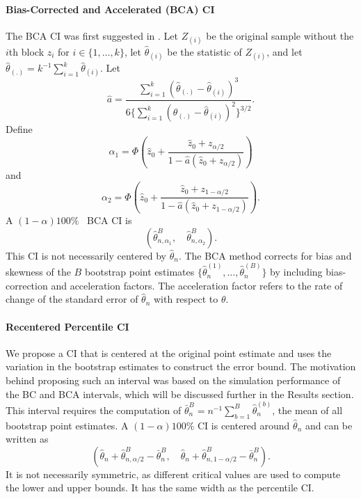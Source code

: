\documentclass[10pt]{article}
\newcommand{\eds}[1]{\textcolor{red}{EDS: (#1)}}
\newcommand{\mc}[1]{\textcolor{orange}{MC: (#1)}}
\begin{document}
\paragraph{Bias-Corrected and Accelerated (BCA) CI}
The BCA CI was first suggested in \citet{efron1987better}. Let $Z_{(i)}$ be the 
original sample without the $i$th block $z_i$ for $i \in \{1, \ldots, k\}$, let 
$\hat{\theta}_{(i)}$ be the statistic of $Z_{(i)}$, and let 
$\hat{\theta}_{(.)} = k^{-1}\sum_{i=1}^{k} \hat{\theta}_{(i)}$. 
Let
\begin{equation*}
\hat{a} = \frac{\sum_{i=1}^{k} (\hat{\theta}_{(.)} -
  \hat{\theta}_{(i)})^3}{6\{\sum_{i=1}^{k} (\hat{\theta}_{(.)} -
  \hat{\theta}_{(i)})^2\}^{3/2}}.
\end{equation*}
Define
\begin{equation*}
\alpha_1 = \Phi\left(\hat{z}_{0} + \frac{\hat{z}_{0} +
  z_{\alpha/2}}{1 - \hat{a}(\hat{z}_{0} + z_{\alpha/2})}\right)
\end{equation*}
and
\begin{equation*}
\alpha_2 = \Phi\left(\hat{z}_{0} + \frac{\hat{z}_{0} +
  z_{1 - \alpha/2}}{1 - \hat{a}(\hat{z}_{0} + z_{1 - \alpha/2})}\right).
\end{equation*}
A $(1 - \alpha)100\%$ ~BCA CI is
\[
(\hat\theta_{n, \alpha_1}^{B}, \quad \hat\theta_{n, \alpha_2}^{B}).
\]
This CI is not necessarily centered by $\hat\theta_n$. The BCA method corrects 
for bias and skewness of the $B$ bootstrap point estimates 
$\{\hat\theta_n^{(1)}, \ldots, \hat\theta_n^{(B)}\}$ by including 
bias-correction and acceleration factors. The acceleration factor refers to the 
rate of change of the standard error of $\hat\theta_n$ with respect to $\theta$.


\paragraph{Recentered Percentile CI}
We propose a CI that is centered at the original point estimate and uses the 
variation in the bootstrap estimates to construct the error bound. 
The motivation behind proposing such an interval was based on the 
simulation performance of the BC and BCA intervals, which will be discussed
further in the Results section. 
This interval 
requires
the computation of $\bar\theta_n^B = n^{-1}\sum_{b=1}^B \hat\theta_n^{(b)}$, the 
mean of all bootstrap point estimates. A $(1 - \alpha)100\%$ CI is
centered around $\hat\theta_n$ and can be written as 
\[
(\hat\theta_n + \hat\theta_{n, \alpha/2}^{B} - \bar\theta_n^{B}, \quad
\hat\theta_n + \hat\theta_{n, 1 - \alpha/2}^{B} - \bar\theta_n^{B}).
\]
It is not necessarily symmetric, as different critical values are used to 
compute the lower and upper bounds. It has the same width as the percentile CI.
\end{document}
